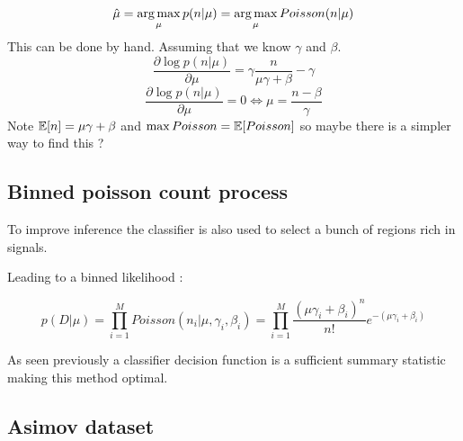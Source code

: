 \begin{equation}
    \hat \mu = \operatorname*{arg\,max}_\mu p(n|\mu) =  \operatorname*{arg\,max}_\mu Poisson(n|\mu)
\end{equation}
This can be done by hand. Assuming that we know $\gamma$ and  $\beta$.
\begin{equation}
    \frac{\partial \log p(n|\mu)}{\partial \mu} =  \gamma \frac{n}{\mu\gamma + \beta} - \gamma
\end{equation}
\begin{equation}
    \frac{\partial \log p(n|\mu)}{\partial \mu} = 0 \iff \mu = \frac{n-\beta}{\gamma}
\end{equation}
Note $\mathbb{E}[n] = \mu\gamma + \beta$ and $\max Poisson = \mathbb{E}[Poisson]$ so maybe there is a simpler way to find this ?






\subsection{Binned poisson count process} %
\label{sub:binned_poisson_count_process}

To improve inference the classifier is also used to select a bunch of regions rich in signals.


Leading to a binned likelihood :

\begin{equation}
	p(D|\mu) = \prod_{i=1}^M Poisson(n_i | \mu, \gamma_i, \beta_i) = \prod_{i=1}^M \frac{(\mu \gamma_i + \beta_i)^n }{n!} e^{-(\mu \gamma_i + \beta_i)}
\end{equation}

As seen previously a classifier decision function is a sufficient summary statistic making this method optimal.





\subsection{Asimov dataset} %
\label{sub:asimov_dataset}








